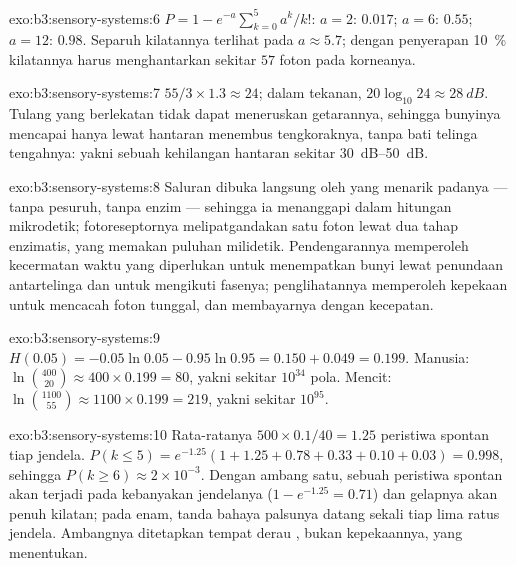 \begin{solution}{exo:b3:sensory-systems:6}
$P = 1 - e^{-a}\sum_{k=0}^{5}a^{k}/k!$: $a = 2$: $0.017$; $a = 6$:
$0.55$; $a = 12$: $0.98$. Separuh kilatannya terlihat pada $a \approx 5.7$;
dengan penyerapan \qty{10}{\%} kilatannya harus menghantarkan sekitar $57$
foton pada korneanya.
\end{solution}

\begin{solution}{exo:b3:sensory-systems:7}
$55/3\times 1.3 \approx 24$; dalam  tekanan, $20\log_{10}24
\approx \qty{28}{dB}$. Tulang yang berlekatan tidak dapat meneruskan getarannya, sehingga
bunyinya mencapai  hanya lewat hantaran menembus tengkoraknya,
tanpa bati telinga tengahnya: yakni sebuah kehilangan hantaran sekitar
\qtyrange{30}{50}{dB}.
\end{solution}

\begin{solution}{exo:b3:sensory-systems:8}
Saluran  dibuka langsung oleh  yang menarik
padanya --- tanpa pesuruh, tanpa enzim --- sehingga ia menanggapi dalam hitungan mikrodetik;
fotoreseptornya melipatgandakan satu foton lewat dua tahap enzimatis, yang
memakan puluhan milidetik. Pendengarannya memperoleh kecermatan waktu yang diperlukan untuk
menempatkan bunyi lewat penundaan antartelinga dan untuk mengikuti fasenya; penglihatannya memperoleh
kepekaan untuk mencacah foton tunggal, dan membayarnya dengan kecepatan.
\end{solution}

\begin{solution}{exo:b3:sensory-systems:9}
$H(0.05) = -0.05\ln 0.05 - 0.95\ln 0.95 = 0.150 + 0.049 = 0.199$.
Manusia: $\ln\binom{400}{20} \approx 400\times 0.199 = 80$, yakni sekitar
$10^{34}$ pola. Mencit: $\ln\binom{1100}{55} \approx 1100\times 0.199
= 219$, yakni sekitar $10^{95}$.
\end{solution}

\begin{solution}{exo:b3:sensory-systems:10}
Rata-ratanya $500\times 0.1/40 = 1.25$ peristiwa spontan tiap jendela. $P(k
\le 5) = e^{-1.25}(1 + 1.25 + 0.78 + 0.33 + 0.10 + 0.03) = 0.998$, sehingga
$P(k \ge 6) \approx 2\times 10^{-3}$. Dengan ambang satu, sebuah
peristiwa spontan akan terjadi pada kebanyakan jendelanya ($1 - e^{-1.25} = 0.71$)
dan gelapnya akan penuh kilatan; pada enam, tanda bahaya palsunya datang sekali
tiap lima ratus jendela. Ambangnya ditetapkan tempat derau
, bukan kepekaannya, yang menentukan.
\end{solution}

